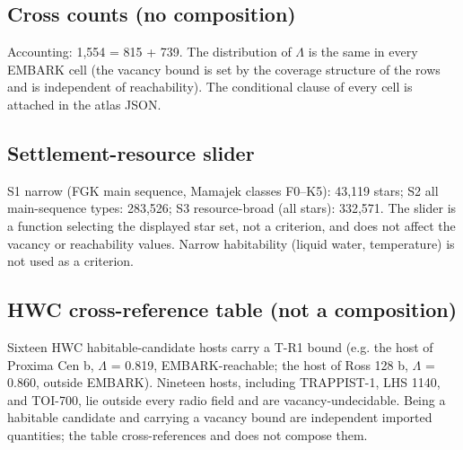 \documentclass{aa}
\begin{document}
\subsection{Cross counts (no composition)}
\begin{table}\end{table}
\noindent Accounting: 1,554 = 815 + 739. The distribution of \(\Lambda\) is the same in every EMBARK cell (the vacancy bound is set by the coverage structure of the rows and is independent of reachability). The conditional clause of every cell is attached in the atlas JSON.\par\smallskip

\subsection{Settlement-resource slider}
\noindent S1 narrow (FGK main sequence, Mamajek classes F0--K5): 43,119 stars; S2 all main-sequence types: 283,526; S3 resource-broad (all stars): 332,571. The slider is a function selecting the displayed star set, not a criterion, and does not affect the vacancy or reachability values. Narrow habitability (liquid water, temperature) is not used as a criterion.\par\smallskip

\subsection{HWC cross-reference table (not a composition)}
\noindent Sixteen HWC habitable-candidate hosts carry a T-R1 bound (e.g. the host of Proxima Cen b, \(\Lambda\) = 0.819, EMBARK-reachable; the host of Ross 128 b, \(\Lambda\) = 0.860, outside EMBARK). Nineteen hosts, including TRAPPIST-1, LHS 1140, and TOI-700, lie outside every radio field and are vacancy-undecidable. Being a habitable candidate and carrying a vacancy bound are independent imported quantities; the table cross-references and does not compose them.\par\smallskip
\end{document}
